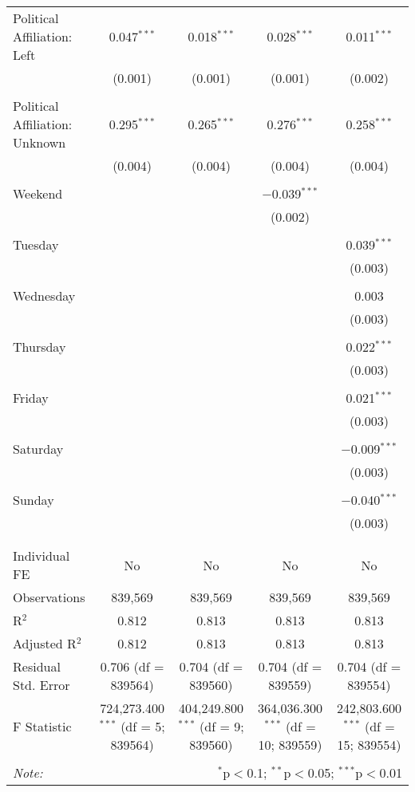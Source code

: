 \documentclass[
]{article}
\begin{document}
\begin{table}[!htbp]
{\begin{tabular}{@{\extracolsep{5pt}}lcccc}
 Political Affiliation: Left & 0.047$^{***}$ & 0.018$^{***}$ & 0.028$^{***}$ & 0.011$^{***}$ \\ 
  & (0.001) & (0.001) & (0.001) & (0.002) \\ 
  & & & & \\ 
 Political Affiliation: Unknown & 0.295$^{***}$ & 0.265$^{***}$ & 0.276$^{***}$ & 0.258$^{***}$ \\ 
  & (0.004) & (0.004) & (0.004) & (0.004) \\ 
  & & & & \\ 
 Weekend &  &  & $-$0.039$^{***}$ &  \\ 
  &  &  & (0.002) &  \\ 
  & & & & \\ 
 Tuesday &  &  &  & 0.039$^{***}$ \\ 
  &  &  &  & (0.003) \\ 
  & & & & \\ 
 Wednesday &  &  &  & 0.003 \\ 
  &  &  &  & (0.003) \\ 
  & & & & \\ 
 Thursday &  &  &  & 0.022$^{***}$ \\ 
  &  &  &  & (0.003) \\ 
  & & & & \\ 
 Friday &  &  &  & 0.021$^{***}$ \\ 
  &  &  &  & (0.003) \\ 
  & & & & \\ 
 Saturday &  &  &  & $-$0.009$^{***}$ \\ 
  &  &  &  & (0.003) \\ 
  & & & & \\ 
 Sunday &  &  &  & $-$0.040$^{***}$ \\ 
  &  &  &  & (0.003) \\ 
  & & & & \\ 
\hline \\[-1.8ex] 
Individual FE & No & No & No & No \\ 
Observations & 839,569 & 839,569 & 839,569 & 839,569 \\ 
R$^{2}$ & 0.812 & 0.813 & 0.813 & 0.813 \\ 
Adjusted R$^{2}$ & 0.812 & 0.813 & 0.813 & 0.813 \\ 
Residual Std. Error & 0.706 (df = 839564) & 0.704 (df = 839560) & 0.704 (df = 839559) & 0.704 (df = 839554) \\ 
F Statistic & 724,273.400$^{***}$ (df = 5; 839564) & 404,249.800$^{***}$ (df = 9; 839560) & 364,036.300$^{***}$ (df = 10; 839559) & 242,803.600$^{***}$ (df = 15; 839554) \\ 
\hline 
\hline \\[-1.8ex] 
\textit{Note:}  & \multicolumn{4}{r}{$^{*}$p$<$0.1; $^{**}$p$<$0.05; $^{***}$p$<$0.01} \\ 
\end{tabular}
} 
\end{table} 
\newpage
\end{document}
